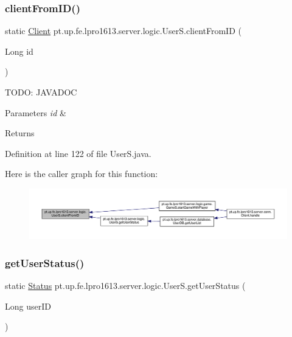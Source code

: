 \subsubsection{\texorpdfstring{client\+From\+I\+D()}{clientFromID()}}
{\footnotesize\ttfamily static \hyperlink{classpt_1_1up_1_1fe_1_1lpro1613_1_1server_1_1conn_1_1_client}{Client} pt.\+up.\+fe.\+lpro1613.\+server.\+logic.\+User\+S.\+client\+From\+ID (\begin{DoxyParamCaption}\item[{Long}]{id }\end{DoxyParamCaption})\hspace{0.3cm}{\ttfamily [static]}}

T\+O\+DO\+: J\+A\+V\+A\+D\+OC 
\begin{DoxyParams}{Parameters}
{\em id} & \\
\hline
\end{DoxyParams}
\begin{DoxyReturn}{Returns}

\end{DoxyReturn}


Definition at line 122 of file User\+S.\+java.

Here is the caller graph for this function\+:
\nopagebreak
\begin{figure}[H]
\begin{center}
\leavevmode
\includegraphics[width=350pt]{classpt_1_1up_1_1fe_1_1lpro1613_1_1server_1_1logic_1_1_user_s_ac189b4e10d166dd53fb0e135c9565fbc_icgraph}
\end{center}
\end{figure}
\hypertarget{classpt_1_1up_1_1fe_1_1lpro1613_1_1server_1_1logic_1_1_user_s_a92958d5006bbce1dbc15722f801d67ef}{}\label{classpt_1_1up_1_1fe_1_1lpro1613_1_1server_1_1logic_1_1_user_s_a92958d5006bbce1dbc15722f801d67ef} 
\subsubsection{\texorpdfstring{get\+User\+Status()}{getUserStatus()}}
{\footnotesize\ttfamily static \hyperlink{enumpt_1_1up_1_1fe_1_1lpro1613_1_1sharedlib_1_1structs_1_1_user_info_1_1_status}{Status} pt.\+up.\+fe.\+lpro1613.\+server.\+logic.\+User\+S.\+get\+User\+Status (\begin{DoxyParamCaption}\item[{Long}]{user\+ID }\end{DoxyParamCaption})\hspace{0.3cm}{\ttfamily [static]}}

